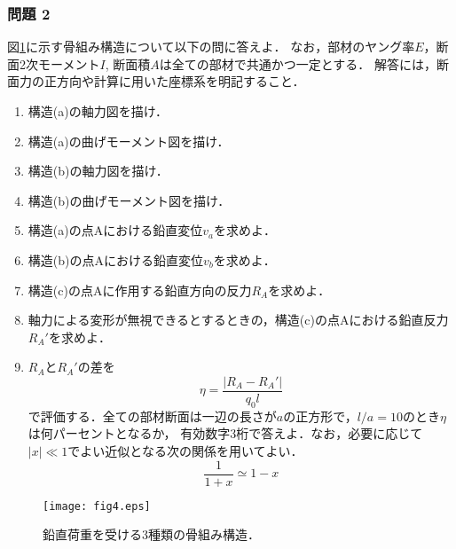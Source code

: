 \documentclass[10pt,a4j]{jarticle}
\begin{document}
\subsubsection*{問題 2}
図\ref{fig:fig4}に示す骨組み構造について以下の問に答えよ． 
なお，部材のヤング率$E$，断面2次モーメント$I$, 断面積$A$は全ての部材で共通かつ一定とする．
解答には，断面力の正方向や計算に用いた座標系を明記すること．
\begin{enumerate}
\item
	構造(a)の軸力図を描け．
\item
	構造(a)の曲げモーメント図を描け．
\item
	構造(b)の軸力図を描け．
\item
	構造(b)の曲げモーメント図を描け．
\item
	構造(a)の点Aにおける鉛直変位$v_a$を求めよ．
\item
	構造(b)の点Aにおける鉛直変位$v_b$を求めよ．
\item
	構造(c)の点Aに作用する鉛直方向の反力$R_A$を求めよ．
\item
	軸力による変形が無視できるとするときの，構造(c)の点Aにおける鉛直反力$R_A'$を求めよ．
\item
	$R_A$と$R_A'$の差を
	\begin{equation}
		\eta =\frac{|R_A-R_A'|}{q_0l}
		\label{eqn:}
	\end{equation}
	で評価する．全ての部材断面は一辺の長さが$a$の正方形で，$l/a=10$のとき$\eta$は何パーセントとなるか，
	有効数字3桁で答えよ．なお，必要に応じて$|x|\ll 1$でよい近似となる次の関係を用いてよい．
	\begin{equation}
		\frac{1}{1+x}\simeq 1-x
	\label{eqn:}
	\end{equation}
\end{enumerate}
\begin{figure}[h]
	\begin{center}
	\texttt{[image: fig4.eps]} 
	\end{center}
	\caption{鉛直荷重を受ける3種類の骨組み構造．} 
	\label{fig:fig4}
\end{figure}
\end{document}
